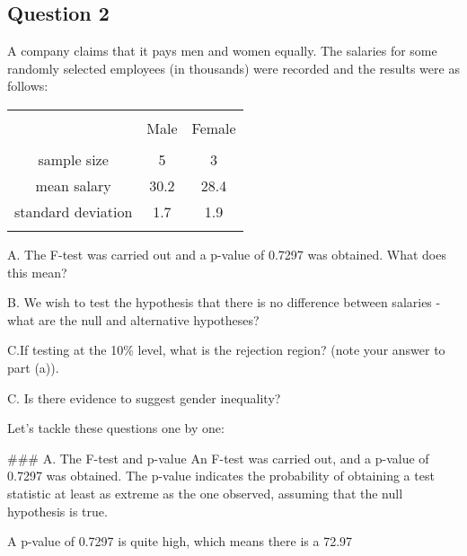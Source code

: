 




\subsection*{Question 2}
A company claims that it pays men and women equally. The salaries for some randomly selected employees (in thousands) were recorded and the results were as follows:\\
\begin{center}
\begin{tabular}{|c|c|c|}
\hline
&&\\[-0.4cm]
& Male & Female \\
\hline
&&\\[-0.4cm]
sample size & 5 & 3 \\
mean salary & 30.2 & 28.4 \\
standard deviation & 1.7 & 1.9 \\
\hline
\multicolumn{3}{c}{}\\[-0.3cm]
\end{tabular}
\end{center}


A. The F-test was carried out and a p-value of 0.7297 was obtained. What does this mean? 

B. We wish to test the hypothesis that there is no difference between salaries - what are the null and alternative hypotheses? 

C.If testing at the 10\% level, what is the rejection region? (note your answer to part (a)). 

C. Is there evidence to suggest gender inequality?

Let's tackle these questions one by one:

### A. The F-test and p-value
An F-test was carried out, and a p-value of 0.7297 was obtained. The p-value indicates the probability of obtaining a test statistic at least as extreme as the one observed, assuming that the null hypothesis is true.

A p-value of 0.7297 is quite high, which means there is a 72.97%

